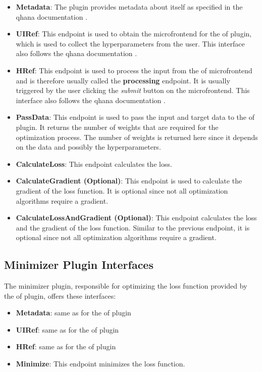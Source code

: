 \documentclass[
  a4paper,  %
  twoside,  %
  bibliography=totoc,
  headsepline,
  cleardoublepage=empty,
  parskip=half,
  draft=false
]{scrbook}
\begin{document}
\begin{itemize}
\item \textbf{Metadata}: The plugin provides metadata about itself as specified in the \gls{qhana} documentation \cite{FabianBuehler}.
\item \textbf{UIRef}: This endpoint is used to obtain the microfrontend for the \gls{of} plugin, which is used to collect the hyperparameters from the user.
This interface also follows the \gls{qhana} documentation \cite{FabianBuehler}.
\item \textbf{HRef}: This endpoint is used to process the input from the \gls{of} microfrontend and is therefore usually called the \textbf{processing} endpoint.
It is usually triggered by the user clicking the \emph{submit} button on the microfrontend.
This interface also follows the \gls{qhana} documentation \cite{FabianBuehler}.
\item \textbf{PassData}: This endpoint is used to pass the input and target data to the \gls{of} plugin.
It returns the number of weights that are required for the optimization process.
The number of weights is returned here since it depends on the data and possibly the hyperparameters.
\item \textbf{CalculateLoss}: This endpoint calculates the loss.
\item \textbf{CalculateGradient (Optional)}: This endpoint is used to calculate the gradient of the loss function. It is optional since not all optimization algorithms require a gradient.
\item \textbf{CalculateLossAndGradient (Optional)}: This endpoint calculates the loss and the gradient of the loss function. Similar to the previous endpoint, it is optional since not all optimization algorithms require a gradient.
\end{itemize}

\subsection{Minimizer Plugin Interfaces}

The minimizer plugin, responsible for optimizing the loss function provided by the \gls{of} plugin, offers these interfaces:

\begin{itemize}
  \item \textbf{Metadata}: same as for the \gls{of} plugin
  \item \textbf{UIRef}: same as for the \gls{of} plugin
  \item \textbf{HRef}: same as for the \gls{of} plugin
  \item \textbf{Minimize}: This endpoint minimizes the loss function.
\end{itemize}
\end{document}
